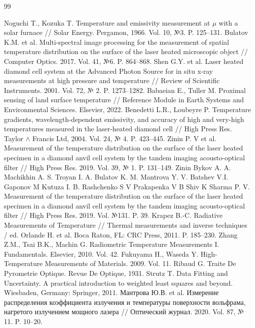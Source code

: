 \begin{thebibliography}{99}
	
Noguchi T., Kozuka T. Temperature and emissivity measurement at $\mu$ with a solar furnace // Solar Energy. Pergamon, 1966. Vol. 10, №3. P. 125–131.
Bulatov K.M. et al. Multi-spectral image processing for the measurement of spatial temperature distribution on the surface of the laser heated microscopic object // Computer Optics. 2017. Vol. 41, №6. P. 864–868.
Shen G.Y. et al. Laser heated diamond cell system at the Advanced Photon Source for in situ x-ray measurements at high pressure and temperature // Review of Scientific Instruments. 2001. Vol. 72, № 2. P. 1273–1282.
Babaeian E., Tuller M. Proximal sensing of land surface temperature // Reference Module in Earth Systems and Environmental Sciences. Elsevier, 2022.
Benedetti L.R., Loubeyre P. Temperature gradients, wavelength-dependent emissivity, and accuracy of high and very-high temperatures measured in the laser-heated diamond cell // High Press Res. Taylor $\land$ Francis Ltd, 2004. Vol. 24, № 4. P. 423–445.
Zinin P. V et al. Measurement of the temperature distribution on the surface of the laser heated specimen in a diamond anvil cell system by the tandem imaging acousto-optical filter // High Press Res. 2019. Vol. 39, № 1. P. 131–149.
Zinin Bykov A. A. Machikhin A. S. Troyan I. A. Bulatov K. M. Mantrova Y. V. Batshev V.I. Gaponov M Kutuza I. B. Rashchenko S V Prakapenka V B Shiv K Sharma P. V. Measurement of the temperature distribution on the surface of the laser heated specimen in a diamond anvil cell system by the tandem imaging acousto-optical filter // High Press Res. 2019. Vol. №131. P. 39.
Krapez B.-C. Radiative Measurements of Temperature // Thermal measurements and inverse techniques / ed. Orlande H. et al. Boca Raton, FL: CRC Press, 2011. P. 185–230.
Zhang Z.M., Tsai B.K., Machin G. Radiometric Temperature Measurements  I. Fundamentals. Elsevier, 2010. Vol. 42.
Fukuyama H., Waseda Y. High-Temperature Measurements of Materials. 2009. Vol. 11.
Ribaud G. Traite De Pyrometrie Optique. Revue De Optique, 1931. 
Strutz T. Data Fitting and Uncertainty. A practical introduction to weighted least squares and beyond. Wiesbaden, Germany: Springer, 2011.
Мантрова Ю.В. et al. Измерение распределения коэффициента излучения и температуры поверхности вольфрама, нагретого излучением мощного лазера // Оптический журнал. 2020. Vol. 87, № 11. P. 10–20.

\end{thebibliography}
